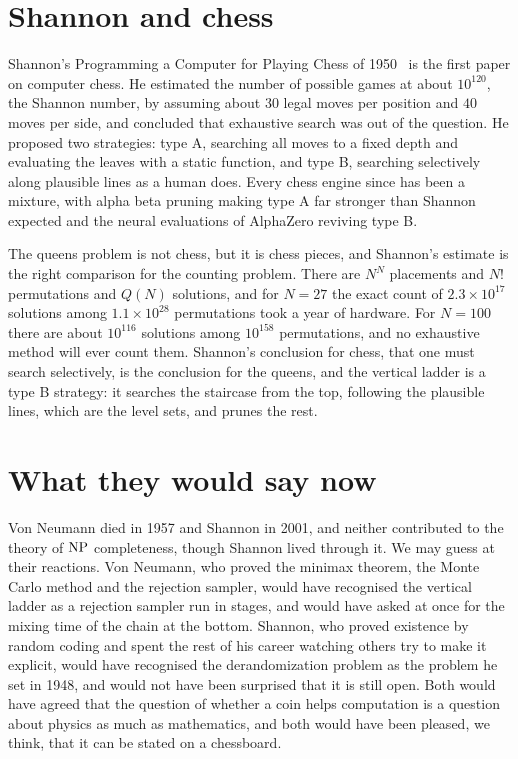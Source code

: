 \section{Shannon and chess}

Shannon's Programming a Computer for Playing Chess of 1950~\cite{Shannon50} is the first paper on computer chess. He estimated the number of possible games at about $10^{120}$, the Shannon number, by assuming about $30$ legal moves per position and $40$ moves per side, and concluded that exhaustive search was out of the question. He proposed two strategies: type A, searching all moves to a fixed depth and evaluating the leaves with a static function, and type B, searching selectively along plausible lines as a human does. Every chess engine since has been a mixture, with alpha beta pruning making type A far stronger than Shannon expected and the neural evaluations of AlphaZero reviving type B.

The queens problem is not chess, but it is chess pieces, and Shannon's estimate is the right comparison for the counting problem. There are $N^N$ placements and $N!$ permutations and $Q(N)$ solutions, and for $N = 27$ the exact count of $2.3 \times 10^{17}$ solutions among $1.1 \times 10^{28}$ permutations took a year of hardware. For $N = 100$ there are about $10^{116}$ solutions among $10^{158}$ permutations, and no exhaustive method will ever count them. Shannon's conclusion for chess, that one must search selectively, is the conclusion for the queens, and the vertical ladder is a type B strategy: it searches the staircase from the top, following the plausible lines, which are the level sets, and prunes the rest.

\section{What they would say now}

Von Neumann died in 1957 and Shannon in 2001, and neither contributed to the theory of $\mathrm{NP}$ completeness, though Shannon lived through it. We may guess at their reactions. Von Neumann, who proved the minimax theorem, the Monte Carlo method and the rejection sampler, would have recognised the vertical ladder as a rejection sampler run in stages, and would have asked at once for the mixing time of the chain at the bottom. Shannon, who proved existence by random coding and spent the rest of his career watching others try to make it explicit, would have recognised the derandomization problem as the problem he set in 1948, and would not have been surprised that it is still open. Both would have agreed that the question of whether a coin helps computation is a question about physics as much as mathematics, and both would have been pleased, we think, that it can be stated on a chessboard.
